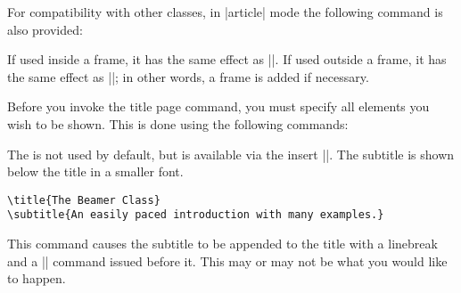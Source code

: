 For compatibility with other classes, in |article| mode the following
command is also provided: 

\begin{command}{\maketitle}
  \beamernote
  If used inside a frame, it has the same effect as |\titlepage|. If
  used outside a frame, it has the same effect as
  |\frame{\titlepage}|; in other words, a frame is added if necessary.
\end{command}


Before you invoke the title page command, you must specify all
elements you wish to be shown. This is done using the following
commands: 


\begin{command}{\subtitle{}}
  The  is not used by default, but is available
  via the insert |\insertshortsubtitle|. The subtitle is shown below
  the title in a smaller font.
  \example
\begin{verbatim}
\title{The Beamer Class}
\subtitle{An easily paced introduction with many examples.}
\end{verbatim}

  \articlenote
  This command causes the subtitle to be appended to the title with a
  linebreak and a |\normalsize| command issued before it. This may or
  may not be what you would like to happen.
\end{command}


